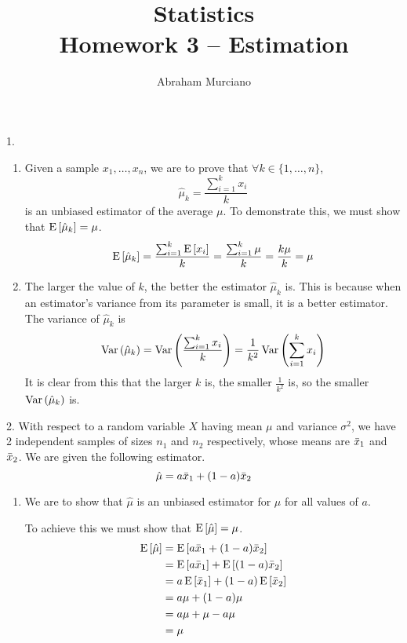 \documentclass[fleqn]{article}
\title{
	Statistics \\
	\medskip
	\large Homework 3 -- Estimation
}
\author{Abraham Murciano}
\begin{document}
\maketitle

\begin{answers}

	\item[1.]
		\begin{enumerate}
			\item %
				Given a sample \(x_1, \dots, x_n\), we are to prove that \(\forall k \in \{1, \dots, n\}\),
				\[\hat{\mu}_k = \frac{\sum_{i=1}^k x_i}{k}\]
				is an unbiased estimator of the average \(\mu\). To demonstrate this, we must show that \(\operatorname{E}\left[\hat{\mu}_k\right] = \mu\).
				\[\operatorname{E}\left[\hat{\mu}_k\right] = \frac{\sum_{i=1}^k \operatorname{E}\left[x_i\right]}{k} = \frac{\sum_{i=1}^k \mu}{k} = \frac{k \mu}{k} = \mu\]

			\item %
				The larger the value of \(k\), the better the estimator \(\hat\mu_k\) is. This is because when an estimator's variance from its parameter is small, it is a better estimator. The variance of \(\hat{\mu}_k\) is
				\[
					\operatorname{Var}\left(\hat{\mu}_k\right)
					= \operatorname{Var}\left(\frac{\sum_{i=1}^k x_i}{k}\right)
					= \frac{1}{k^2} \operatorname{Var}\left(\sum_{i=1}^k x_i\right)
				\]
				It is clear from this that the larger \(k\) is, the smaller \(\frac{1}{k^2}\) is, so the smaller \(\operatorname{Var}\left(\hat{\mu}_k\right)\) is.
		\end{enumerate}

	\item[2.]
		With respect to a random variable \(X\) having mean \(\mu\) and variance \(\sigma^2\), we have 2 independent samples of sizes \(n_1\) and \(n_2\) respectively, whose means are \(\bar{x}_1\) and \(\bar{x}_2\). We are given the following estimator.
		\[\hat{\mu} = a\bar{x}_1 + (1-a)\bar{x}_2\]
		\begin{enumerate}
			\item %
				We are to show that \(\hat{\mu}\) is an unbiased estimator for \(\mu\) for all values of \(a\).

				To achieve this we must show that \(\operatorname{E}\left[\hat\mu\right] = \mu\).
				\begin{align*}
					\operatorname{E}\left[\hat{\mu}\right] & = \operatorname{E}\left[a\bar{x}_1 + (1-a)\bar{x}_2\right] \\
					              & = \operatorname{E}\left[a\bar{x}_1\right] + \operatorname{E}\left[(1-a)\bar{x}_2\right] \\
					              & = a \operatorname{E}\left[\bar{x}_1\right] + (1-a) \operatorname{E}\left[\bar{x}_2\right] \\
					              & = a \mu + (1-a) \mu \\
					              & = a \mu + \mu - a \mu \\
					              & = \mu
				\end{align*}


\end{enumerate}
\end{answers}
\end{document}
